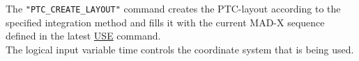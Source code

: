 The \texttt{"PTC\_CREATE\_LAYOUT"} command creates the PTC-layout
according to  the specified integration method and fills it with the
current  MAD-X sequence defined in the latest
\href{../control/general.html#use}{ USE} command.  
\\ 
The logical input variable time  controls the coordinate system that
is being used. 

    
